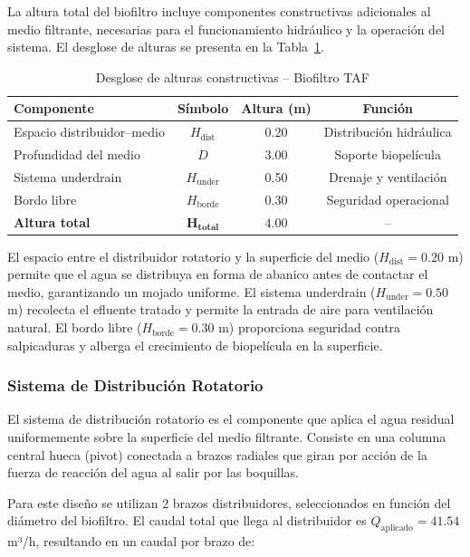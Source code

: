 \documentclass[12pt,a4paper]{article}
\begin{document}
La altura total del biofiltro incluye componentes constructivas adicionales al medio filtrante, necesarias para el funcionamiento hidráulico y la operación del sistema. El desglose de alturas se presenta en la Tabla~\ref{tab:alturas_taf}.

\begin{table}[H]
\centering
\caption{Desglose de alturas constructivas -- Biofiltro TAF}
\label{tab:alturas_taf}
\begin{tabular}{lccc}
\toprule
\textbf{Componente} & \textbf{Símbolo} & \textbf{Altura (m)} & \textbf{Función} \\
\midrule
Espacio distribuidor--medio & $H_{\text{dist}}$ & 0.20 & Distribución hidráulica \\
Profundidad del medio & $D$ & 3.00 & Soporte biopelícula \\
Sistema underdrain & $H_{\text{under}}$ & 0.50 & Drenaje y ventilación \\
Bordo libre & $H_{\text{borde}}$ & 0.30 & Seguridad operacional \\
\midrule
\textbf{Altura total} & $\mathbf{H_{\text{total}}}$ & $\mathbf{4.00}$ & -- \\
\bottomrule
\end{tabular}
\end{table}

El espacio entre el distribuidor rotatorio y la superficie del medio ($H_{\text{dist}} = 0.20$ m) permite que el agua se distribuya en forma de abanico antes de contactar el medio, garantizando un mojado uniforme. El sistema underdrain ($H_{\text{under}} = 0.50$ m) recolecta el efluente tratado y permite la entrada de aire para ventilación natural. El bordo libre ($H_{\text{borde}} = 0.30$ m) proporciona seguridad contra salpicaduras y alberga el crecimiento de biopelícula en la superficie.

\subsubsection*{Sistema de Distribución Rotatorio}

El sistema de distribución rotatorio es el componente que aplica el agua residual uniformemente sobre la superficie del medio filtrante. Consiste en una columna central hueca (pivot) conectada a brazos radiales que giran por acción de la fuerza de reacción del agua al salir por las boquillas.

Para este diseño se utilizan 2 brazos distribuidores, seleccionados en función del diámetro del biofiltro. El caudal total que llega al distribuidor es $Q_{\text{aplicado}} = 41.54$ m³/h, resultando en un caudal por brazo de:
\end{document}
